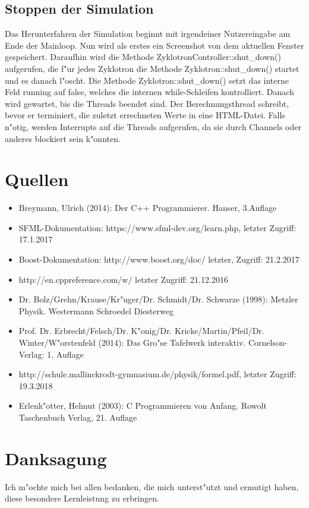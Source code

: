 \documentclass[14pt, a4paper]{report}
\begin{document}
\section{Stoppen der Simulation}
Das Herunterfahren der Simulation beginnt mit irgendeiner 
Nutzereingabe am Ende der Mainloop. Nun wird
als erstes ein Screenshot von dem aktuellen Fenster gespeichert. Daraufhin wird die Methode
ZyklotronController::shut\_down() aufgerufen, die f"ur jedes Zyklotron die Methode Zyklotron::shut\_down()
startet und es danach l"oscht. Die Methode Zyklotron::shut\_down() setzt das interne Feld running
auf false, welches die internen while-Schleifen kontrolliert. Danach wird gewartet, bis die Threads
beendet sind. Der Berechnungsthread schreibt, bevor er terminiert, die zuletzt errechneten Werte in
eine HTML-Datei. Falls n"otig, werden Interrupts auf die Threads aufgerufen, da sie durch Channels
oder anderes blockiert sein k"onnten.

\chapter{Quellen}
\begin{itemize}

\item Breymann, Ulrich (2014): Der C++ Programmierer. Hanser, 3.Auflage
\item SFML-Dokumentation: https://www.sfml-dev.org/learn.php, letzter Zugriff: 17.1.2017
\item Boost-Dokumentation: http://www.boost.org/doc/ letzter, Zugriff: 21.2.2017
\item http://en.cppreference.com/w/ letzter Zugriff: 21.12.2016
\item Dr. Bolz/Grehn/Krause/Kr"uger/Dr. Schmidt/Dr. Schwarze (1998): Metzler Physik. Westermann Schroedel Diesterweg
\item Prof. Dr. Erbrecht/Felsch/Dr. K"onig/Dr. Kricke/Martin/Pfeil/Dr. Winter/W"orstenfeld (2014): Das Gro"se Tafelwerk interaktiv. Cornelson-Verlag: 1. Auflage
\item http://schule.mallinckrodt-gymnasium.de/physik/formel.pdf, letzter Zugriff: 19.3.2018
\item Erlenk"otter, Helmut (2003): C Programmieren von Anfang. Rowolt Taschenbuch Verlag, 21. Auflage
\end{itemize}

\chapter{Danksagung}
Ich m"ochte mich bei allen bedanken, die mich unterst"utzt und ermutigt haben, diese
besondere Lernleistung zu erbringen.
\end{document}

